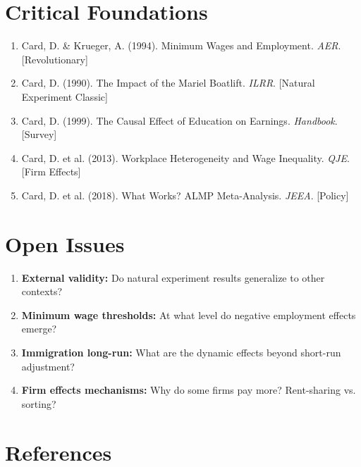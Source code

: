 \section{Critical Foundations}

\begin{enumerate}
    \item Card, D. \& Krueger, A. (1994). Minimum Wages and Employment. \textit{AER}. [Revolutionary]
    \item Card, D. (1990). The Impact of the Mariel Boatlift. \textit{ILRR}. [Natural Experiment Classic]
    \item Card, D. (1999). The Causal Effect of Education on Earnings. \textit{Handbook}. [Survey]
    \item Card, D. et al. (2013). Workplace Heterogeneity and Wage Inequality. \textit{QJE}. [Firm Effects]
    \item Card, D. et al. (2018). What Works? ALMP Meta-Analysis. \textit{JEEA}. [Policy]
\end{enumerate}

\section{Open Issues}

\begin{enumerate}
    \item \textbf{External validity:} Do natural experiment results generalize to other contexts?
    \item \textbf{Minimum wage thresholds:} At what level do negative employment effects emerge?
    \item \textbf{Immigration long-run:} What are the dynamic effects beyond short-run adjustment?
    \item \textbf{Firm effects mechanisms:} Why do some firms pay more? Rent-sharing vs. sorting?
\end{enumerate}

\section{References}


